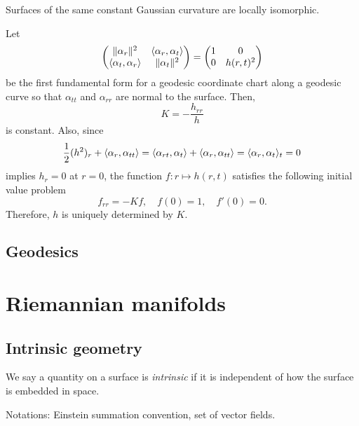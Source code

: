 \documentclass{../note}
\def\a{\alpha}
\begin{document}
\begin{thm}
Surfaces of the same constant Gaussian curvature are locally isomorphic.
\end{thm}
\begin{pf}
Let
\[\mat{\|\a_r\|^2&\<\a_r,\a_t\>\\\<\a_t,\a_r\>&\|\a_t\|^2}=\mat{1&0\\0&h(r,t)^2}\]
be the first fundamental form for a geodesic coordinate chart along a geodesic curve so that $\a_{tt}$ and $\a_{rr}$ are normal to the surface.
Then,
\[K=-\frac{h_{rr}}h\]
is constant.
Also, since
\[\frac12(h^2)_r+\<\a_r,\a_{tt}\>=\<\a_{rt},\a_t\>+\<\a_r,\a_{tt}\>=\<\a_r,\a_t\>_t=0\]
implies $h_r=0$ at $r=0$, the function $f:r\mapsto h(r,t)$ satisfies the following initial value problem
\[f_{rr}=-Kf,\quad f(0)=1,\quad f'(0)=0.\]
Therefore, $h$ is uniquely determined by $K$.
\end{pf}



\chapter{Geodesics}





























\part{Riemannian manifolds}


\chapter{Intrinsic geometry}

We say a quantity on a surface is \emph{intrinsic} if it is independent of how the surface is embedded in space.

Notations: Einstein summation convention, set of vector fields.
\end{document}
